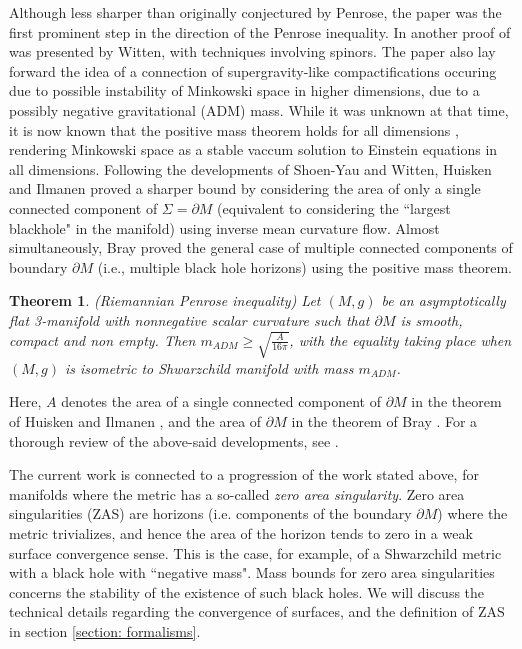 \documentclass{amsart}
\newtheorem{theorem}{Theorem}
\theoremstyle{named}
\begin{document}
Although less sharper than originally conjectured by Penrose, the paper was the first prominent step in the direction of the Penrose inequality. In \cite{witten1981new} another proof of was presented by Witten, with techniques involving spinors. The paper also lay forward the idea of a connection of  supergravity-like compactifications occuring due to possible instability of Minkowski space in higher dimensions, due to a possibly negative gravitational (ADM) mass. While it was unknown at that time, it is now known that the positive mass theorem holds for all dimensions \cite{schoen2017positive}, rendering Minkowski space as a stable vaccum solution to Einstein equations in all dimensions. Following the developments of Shoen-Yau and Witten, Huisken and Ilmanen \cite{huiskenilmanen} proved a sharper bound by considering the area of only a single connected component of $\Sigma = \partial M$ (equivalent to considering the ``largest blackhole" in the manifold) using inverse mean curvature flow. Almost simultaneously, Bray \cite{bray1999proof} proved the general case of multiple connected components of boundary $\partial M$ (i.e., multiple black hole horizons) using the positive mass theorem. \\ 

\begin{theorem}(Riemannian Penrose inequality)
    Let $(M,g)$ be an asymptotically flat 3-manifold with nonnegative scalar curvature such that $\partial M$ is smooth, compact and non empty. Then $m_{ADM} \geq \sqrt{\frac{A}{16\pi}}$, with the equality taking place when $(M,g)$ is isometric to Shwarzchild manifold with mass $m_{ADM}$. 
\end{theorem}

Here, $A$ denotes the area of a single connected component of $\partial M$ in the theorem of Huisken and Ilmanen \cite{huiskenilmanen}, and the area of $\partial M$ in the theorem of Bray \cite{bray1999proof}. For a thorough review of the above-said developments, see \cite{Bray:2003ns}.

The current work is connected to a progression of the work stated above, for manifolds where the metric has a so-called \textit{zero area singularity}. Zero area singularities (ZAS) are horizons (i.e. components of the boundary $\partial M$) where the metric trivializes, and hence the area of the horizon tends to zero in a weak surface convergence sense. This is the case, for example, of a Shwarzchild metric with a black hole with ``negative mass". Mass bounds for zero area singularities concerns the stability of the existence of such black holes. We will discuss the technical details regarding the convergence of surfaces, and the definition of ZAS in section \ref{section: formalisms}. \\
\end{document}
